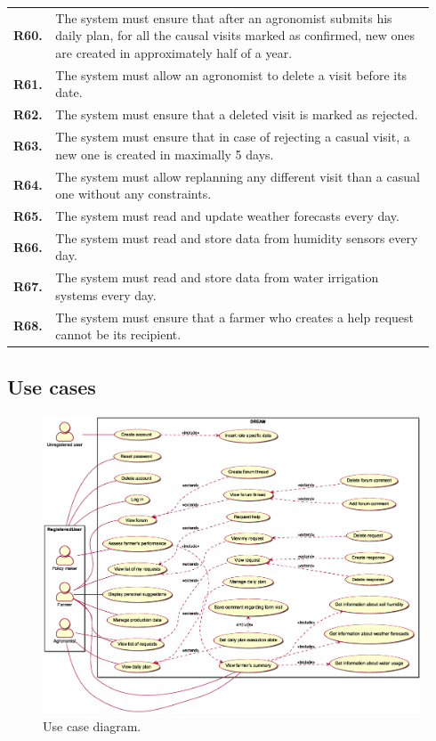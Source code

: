 \begin{longtable}{@{}p{0.06\linewidth} p{0.88\linewidth}}
	\textbf{R60.} & The system must ensure that after an agronomist submits his daily plan, for all the causal visits marked as confirmed, new ones are created in approximately half of a year.\\
	\textbf{R61.} & The system must allow an agronomist to delete a visit before its date.\\
	\textbf{R62.} & The system must ensure that a deleted visit is marked as rejected.\\
	\textbf{R63.} & The system must ensure that in case of rejecting a casual visit, a new one is created in maximally 5 days.\\
	\textbf{R64.} & The system must allow replanning any different visit than a casual one without any constraints.\\
	
	\textbf{R65.} & The system must read and update weather forecasts every day. \\
	\textbf{R66.} & The system must read and store data from humidity sensors every day. \\
	\textbf{R67.} & The system must read and store data from water irrigation systems every day. \\
	\textbf{R68.} & The system must ensure that a farmer who creates a help request cannot be its recipient.\\
		
	\bottomrule
\end{longtable}

\subsection{Use cases}
\begin{figure}[H]
    \centering
    \includegraphics[width=0.92\textheight, keepaspectratio, origin=c, angle=90]{diagrams/use_case}
    \caption{Use case diagram.}
    \label{fig:uc_diagram}
\end{figure}

